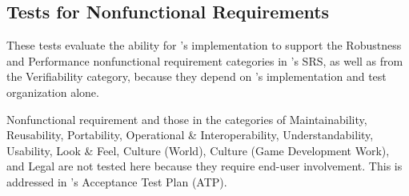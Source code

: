 \subsection{Tests for Nonfunctional Requirements}
These tests evaluate the ability for \progname{}'s implementation to support
the Robustness and Performance nonfunctional requirement categories in
\progname{}'s SRS, as well as  from the Verifiability category,
because they depend on \progname{}'s implementation and test organization alone.

Nonfunctional requirement  and those in the categories of
Maintainability, Reusability, Portability, Operational \& Interoperability,
Understandability, Usability, Look \& Feel, Culture (World), Culture (Game
Development Work), and Legal are not tested here because they require end-user
involvement. This is addressed in \progname{}'s Acceptance Test Plan (ATP).




